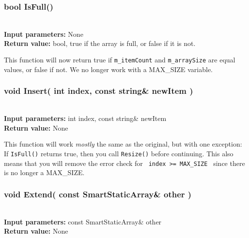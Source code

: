 \documentclass[a4paper,12pt]{book}
\begin{document}
    \hrulefill
    \subsubsection*{bool IsFull()}

    \begin{framed} ~\\
        \textbf{Input parameters:} None \\
        \textbf{Return value:} bool, true if the array is full, or false if it is not.
    \end{framed}

    This function will now return true if \texttt{m\_itemCount} and
    \texttt{m\_arraySize} are equal values, or false if not.
    We no longer work with a MAX\_SIZE{} variable.


    \newpage
    \subsubsection*{void Insert( int index, const string\& newItem )}

    \begin{framed} ~\\
        \textbf{Input parameters:} int index, const string\& newItem \\
        \textbf{Return value:} None
    \end{framed}

    This function will work \textit{mostly} the same as the original,
    but with one exception: If \texttt{IsFull()} returns true,
    then you call \texttt{Resize()} before continuing. This also means
    that you will remove the error check for \texttt{ index >= MAX\_SIZE }
    since there is no longer a MAX\_SIZE.




    \hrulefill
    \subsubsection*{void Extend( const SmartStaticArray\& other )}

    \begin{framed} ~\\
        \textbf{Input parameters:} const SmartStaticArray\& other \\
        \textbf{Return value:} None
    \end{framed}
\end{document}
